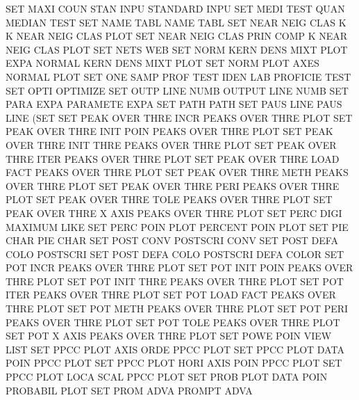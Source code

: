 SET      MAXI COUN STAN INPU            STANDARD INPU
SET      MEDI TEST QUAN                 MEDIAN   TEST
SET      NAME TABL                      NAME     TABL
SET      NEAR NEIG CLAS K               K        NEAR NEIG CLAS PLOT
SET      NEAR NEIG CLAS PRIN COMP       K        NEAR NEIG CLAS PLOT
SET      NETS                           WEB
SET      NORM KERN DENS MIXT PLOT EXPA  NORMAL   KERN DENS MIXT PLOT
SET      NORM PLOT AXES                 NORMAL   PLOT
SET      ONE  SAMP PROF TEST IDEN LAB   PROFICIE TEST
SET      OPTI                           OPTIMIZE
SET      OUTP LINE NUMB                 OUTPUT   LINE NUMB
SET      PARA EXPA                      PARAMETE EXPA
SET      PATH                           PATH
SET      PAUS LINE                      PAUS     LINE (SET
SET      PEAK OVER THRE INCR            PEAKS    OVER THRE PLOT
SET      PEAK OVER THRE INIT POIN       PEAKS    OVER THRE PLOT
SET      PEAK OVER THRE INIT THRE       PEAKS    OVER THRE PLOT
SET      PEAK OVER THRE ITER            PEAKS    OVER THRE PLOT
SET      PEAK OVER THRE LOAD FACT       PEAKS    OVER THRE PLOT
SET      PEAK OVER THRE METH            PEAKS    OVER THRE PLOT
SET      PEAK OVER THRE PERI            PEAKS    OVER THRE PLOT
SET      PEAK OVER THRE TOLE            PEAKS    OVER THRE PLOT
SET      PEAK OVER THRE X    AXIS       PEAKS    OVER THRE PLOT
SET      PERC DIGI                      MAXIMUM  LIKE
SET      PERC POIN PLOT                 PERCENT  POIN PLOT
SET      PIE  CHAR                      PIE      CHAR
SET      POST CONV                      POSTSCRI CONV
SET      POST DEFA COLO                 POSTSCRI
SET      POST DEFA COLO                 POSTSCRI DEFA COLOR
SET      POT  INCR                      PEAKS    OVER THRE PLOT
SET      POT  INIT POIN                 PEAKS    OVER THRE PLOT
SET      POT  INIT THRE                 PEAKS    OVER THRE PLOT
SET      POT  ITER                      PEAKS    OVER THRE PLOT
SET      POT  LOAD FACT                 PEAKS    OVER THRE PLOT
SET      POT  METH                      PEAKS    OVER THRE PLOT
SET      POT  PERI                      PEAKS    OVER THRE PLOT
SET      POT  TOLE                      PEAKS    OVER THRE PLOT
SET      POT  X    AXIS                 PEAKS    OVER THRE PLOT
SET      POWE POIN VIEW                 LIST
SET      PPCC PLOT AXIS ORDE            PPCC     PLOT
SET      PPCC PLOT DATA POIN            PPCC     PLOT
SET      PPCC PLOT HORI AXIS POIN       PPCC     PLOT
SET      PPCC PLOT LOCA SCAL            PPCC     PLOT
SET      PROB PLOT DATA POIN            PROBABIL PLOT
SET      PROM ADVA                      PROMPT   ADVA
